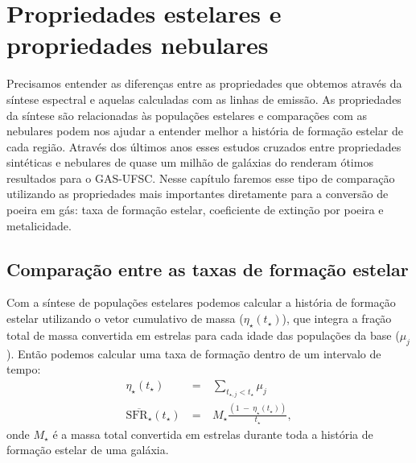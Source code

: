


\chapter{Propriedades estelares e propriedades nebulares}
\label{sec:synvsneb}

Precisamos entender as diferenças entre as propriedades que obtemos através da síntese espectral e
aquelas calculadas com as linhas de emissão. As propriedades da síntese são relacionadas às
populações estelares e comparações com as nebulares podem nos ajudar a entender melhor a história de
formação estelar de cada região. Através dos últimos anos esses estudos cruzados entre propriedades
sintéticas e nebulares de quase um milhão de galáxias do \SDSS renderam ótimos resultados para o
GAS-UFSC. Nesse capítulo faremos esse tipo de comparação utilizando as propriedades mais importantes
diretamente para a conversão de poeira em gás: taxa de formação estelar, coeficiente de extinção por
poeira e metalicidade.

\section{Comparação entre as taxas de formação estelar}
\label{sec:synvsneb:SFR}

Com a síntese de populações estelares podemos calcular a história de formação estelar utilizando o
vetor cumulativo de massa ($\eta_\star(t_\star)$), que integra a fração total de massa convertida em
estrelas para cada idade das populações da base ($\mu_j$). Então podemos calcular uma taxa de
formação dentro de um intervalo de tempo:
\begin{eqnarray}
	\eta_\star(t_\star)\ &=&\ \sum\limits_{t_{\star,j} < t_\star} \mu_j \\
	\overline{\mathrm{SFR}_\star}(t_\star)\ &=&\ M_\star \frac{(1\ -\ \eta_\star(t_\star))}{t_\star},
\end{eqnarray}
\noindent onde $M_\star$ é a massa total convertida em estrelas durante toda a história de
formação estelar de uma galáxia. 

